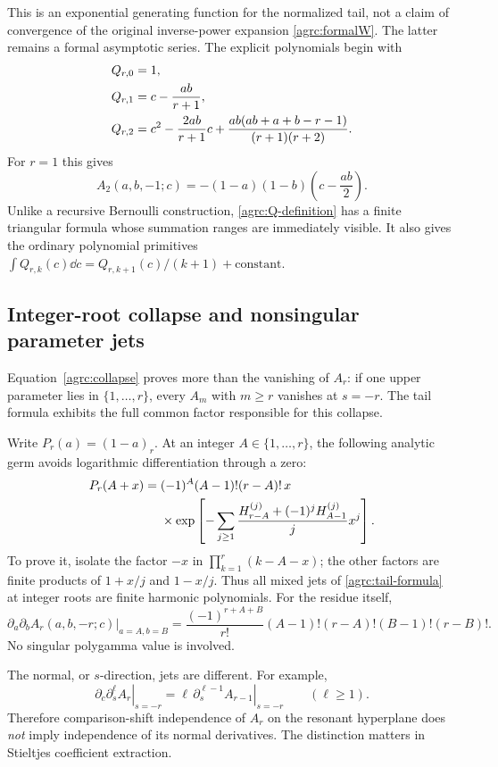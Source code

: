 This is an exponential generating function for the normalized tail,
not a claim of convergence of the original inverse-power expansion
\eqref{agrc:formalW}. The latter remains a formal asymptotic series.
The explicit polynomials begin with
\begin{align}
 Q_{r,0}&=1,\notag\\
 Q_{r,1}&=c-\frac{ab}{r+1},\notag\\
 Q_{r,2}&=c^2-\frac{2ab}{r+1}c
      +\frac{ab(ab+a+b-r-1)}{(r+1)(r+2)}.
 \label{agrc:Q-examples}
\end{align}
For $r=1$ this gives
\[
 A_2(a,b,-1;c)=-(1-a)(1-b)\left(c-\frac{ab}{2}\right).
\]
Unlike a recursive Bernoulli construction, \eqref{agrc:Q-definition}
has a finite triangular formula whose summation ranges are immediately
visible. It also gives the ordinary polynomial primitives
$\int Q_{r,k}(c)\dd c=Q_{r,k+1}(c)/(k+1)+\mathrm{constant}$.

\subsection{Integer-root collapse and nonsingular parameter jets}

Equation~\eqref{agrc:collapse} proves more than the vanishing of $A_r$:
if one upper parameter lies in $\{1,\ldots,r\}$, every $A_m$ with
$m\geq r$ vanishes at $s=-r$. The tail formula exhibits the full common
factor responsible for this collapse.

Write $P_r(a)=(1-a)_r$. At an integer $A\in\{1,\ldots,r\}$, the
following analytic germ avoids logarithmic differentiation through a
zero:
\begin{align}
 P_r(A+x)={}&(-1)^A(A-1)!(r-A)!\,x\notag\\
 &\times\exp\left[-\sum_{j\geq1}
  \frac{H_{r-A}^{(j)}+(-1)^jH_{A-1}^{(j)}}j x^j\right].
 \label{agrc:root-jets}
\end{align}
To prove it, isolate the factor $-x$ in $\prod_{k=1}^r(k-A-x)$;
the other factors are finite products of $1+x/j$ and $1-x/j$.
Thus all mixed jets of \eqref{agrc:tail-formula} at integer roots are
finite harmonic polynomials. For the residue itself,
\begin{equation}\label{agrc:double-root}
 \left.\partial_a\partial_b A_r(a,b,-r;c)\right|_{a=A,b=B}
 =\frac{(-1)^{r+A+B}}{r!}
 (A-1)!(r-A)!(B-1)!(r-B)!.
\end{equation}
No singular polygamma value is involved.

The normal, or $s$-direction, jets are different. For example,
\begin{equation}\label{agrc:normal-transport}
 \left.\partial_c\partial_s^\ell A_r\right|_{s=-r}
 =\left.\ell\,\partial_s^{\ell-1}A_{r-1}\right|_{s=-r}
 \qquad(\ell\geq1).
\end{equation}
Therefore comparison-shift independence of $A_r$ on the resonant
hyperplane does \emph{not} imply independence of its normal derivatives.
The distinction matters in Stieltjes coefficient extraction.

